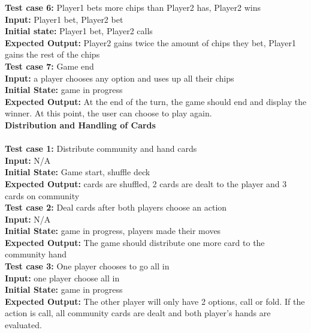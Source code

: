 \documentclass[12pt]{article}
\begin{document}
    \noindent \textbf{Test case 6:} Player1 bets more chips than Player2 has, Player2 wins\\
    \textbf{Input:} Player1 bet, Player2 bet\\
    \textbf{Initial state:} Player1 bet, Player2 calls\\
    \textbf{Expected Output:} Player2 gains twice the amount of chips they bet, Player1 gains the
    rest of the chips\\

    \noindent \textbf{Test case 7:} Game end\\
	\textbf{Input:} a player chooses any option and uses up all their chips\\
	\textbf{Initial State:} game in progress\\
	\textbf{Expected Output:} At the end of the turn, the game should end and display the winner. At this point, the user can choose to play again. \\

    \noindent \textbf{Distribution and Handling of Cards}\\
    \\
    \textbf{Test case 1:} Distribute community and hand cards\\
    \textbf{Input:} N/A\\
	\textbf{Initial State:} Game start, shuffle deck\\
	\textbf{Expected Output:} cards are shuffled, 2 cards are dealt to the player and 3 cards on community\\

   	\noindent \textbf{ Test case 2:} Deal cards after both players choose an action\\
    \textbf{Input:} N/A\\
    \textbf{Initial State:} game in progress, players made their moves\\
    \textbf{Expected Output:} The game should distribute one more card to the community hand\\

    \noindent \textbf{Test case 3:} One player chooses to go all in \\
    \textbf{Input:} one player choose all in\\
    \textbf{Initial State:} game in progress\\
    \textbf{Expected Output:} The other player will only have 2 options, call or fold. If the action is  
call, all community cards are dealt and both player’s hands are evaluated.  \\
\end{document}
